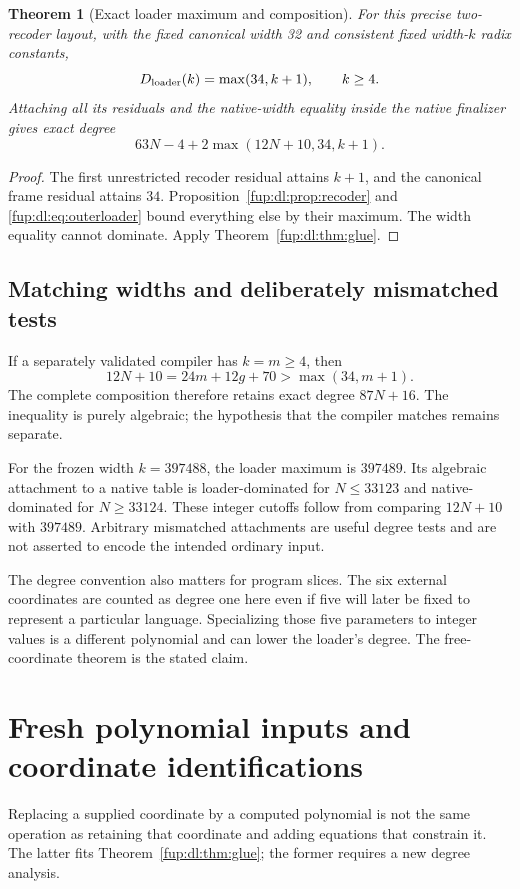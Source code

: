 \documentclass[11pt,letterpaper]{article}
\newtheorem{theorem}{Theorem}[section]
\theoremstyle{definition}\newtheorem{definition}[theorem]{Definition}
\theoremstyle{remark}\newtheorem{remark}[theorem]{Remark}
\begin{document}
\begin{theorem}[Exact loader maximum and composition]\label{fup:dl:thm:loader}
For this precise two-recoder layout, with the fixed canonical width 32 and consistent fixed width-$k$ radix constants,
\[
 D_{\rm loader}(k)=\max(34,k+1),\qquad k\ge4.
\]
Attaching all its residuals and the native-width equality inside the native finalizer gives exact degree
\begin{equation}\label{fup:dl:eq:loaderdegree}
 63N-4+2\max(12N+10,34,k+1).
\end{equation}
\end{theorem}
\begin{proof}
The first unrestricted recoder residual attains $k+1$, and the canonical frame residual attains $34$. Proposition~\ref{fup:dl:prop:recoder} and \eqref{fup:dl:eq:outerloader} bound everything else by their maximum. The width equality cannot dominate. Apply Theorem~\ref{fup:dl:thm:glue}.
\end{proof}

\subsection{Matching widths and deliberately mismatched tests}
If a separately validated compiler has $k=m\ge4$, then
\[
 12N+10=24m+12g+70>\max(34,m+1).
\]
The complete composition therefore retains exact degree $87N+16$. The inequality is purely algebraic; the hypothesis that the compiler matches remains separate.

For the frozen width $k=397488$, the loader maximum is $397489$. Its algebraic attachment to a native table is loader-dominated for $N\le33123$ and native-dominated for $N\ge33124$. These integer cutoffs follow from comparing $12N+10$ with $397489$. Arbitrary mismatched attachments are useful degree tests and are not asserted to encode the intended ordinary input.

The degree convention also matters for program slices. The six external coordinates are counted as degree one here even if five will later be fixed to represent a particular language. Specializing those five parameters to integer values is a different polynomial and can lower the loader's degree. The free-coordinate theorem is the stated claim.

\section{Fresh polynomial inputs and coordinate identifications}\label{fup:dl:sec:fresh}
Replacing a supplied coordinate by a computed polynomial is not the same operation as retaining that coordinate and adding equations that constrain it. The latter fits Theorem~\ref{fup:dl:thm:glue}; the former requires a new degree analysis.
\end{document}
